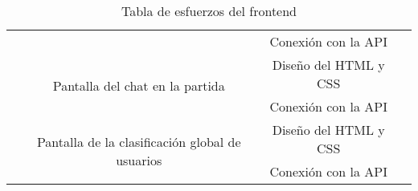 \documentclass[11pt, a4paper, titlepage]{article}
\begin{document}
\begin{landscape}
\begin{table}[hbt!]
\begin{tabular}{c|ccll|cc|}
\multicolumn{1}{|c|}{}                            & \multicolumn{1}{c|}{}                                                                                           & \multicolumn{3}{c|}{Conexión con la API}                                                                       & \multicolumn{2}{c|}{}                                                        \\ \cline{2-5}
\multicolumn{1}{|c|}{}                            & \multicolumn{1}{c|}{\multirow{2}{*}{Pantalla del chat en la partida}}                                           & \multicolumn{3}{c|}{Diseño del HTML y CSS}                                                                     & \multicolumn{2}{c|}{}                                                        \\ \cline{3-5}
\multicolumn{1}{|c|}{}                            & \multicolumn{1}{c|}{}                                                                                           & \multicolumn{3}{c|}{Conexión con la API}                                                                       & \multicolumn{2}{c|}{}                                                        \\ \cline{2-5}
\multicolumn{1}{|c|}{}                            & \multicolumn{1}{c|}{\multirow{2}{*}{Pantalla de la clasificación global de usuarios}}                           & \multicolumn{3}{c|}{Diseño del HTML y CSS}                                                                     & \multicolumn{2}{c|}{}                                                        \\ \cline{3-5}
\multicolumn{1}{|c|}{}                            & \multicolumn{1}{c|}{}                                                                                           & \multicolumn{3}{c|}{Conexión con la API}                                                                       & \multicolumn{2}{c|}{}                                                        \\ \hline
\end{tabular}
\caption{Tabla de esfuerzos del frontend}
\label{table:frontend}
\end{table}
\end{landscape}
\FloatBarrier

\newpage
\end{document}
